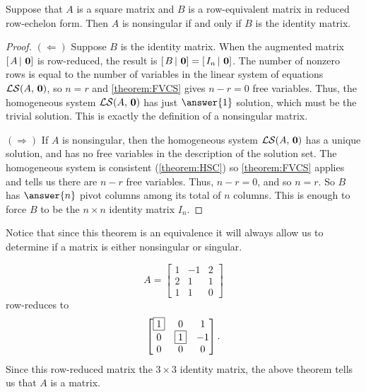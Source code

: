 \documentclass{ximera}
\begin{document}
\begin{theorem}
  \label{theorem:NMRRI}
  Suppose that $A$ is a square matrix and $B$ is a row-equivalent
  matrix in reduced row-echelon form.  Then $A$ is nonsingular if and
  only if $B$ is the identity matrix.

\begin{proof}
  $(\Leftarrow)$ Suppose $B$ is the identity matrix.  When the
  augmented matrix $\left\lbrack\left.A\,\right\rvert\,\mathbf{0}\right\rbrack$ is row-reduced, the
  result is $\left\lbrack\left.B\,\right\rvert\,\mathbf{0}\right\rbrack=\left\lbrack\left.I_n\,\right\rvert\,\mathbf{0}\right\rbrack$.
  The number of nonzero rows is equal to the number of variables in
  the linear system of equations $\mathcal{LS}\!\left(A,\,\mathbf{0}\right)$, so
  $n=r$ and \ref{theorem:FVCS} gives $n-r=0$ free variables.  Thus,
  the homogeneous system $\mathcal{LS}\!\left(A,\,\mathbf{0}\right)$ has just $\answer{1}$
  solution, which must be the trivial solution.  This is exactly the
  definition of a nonsingular matrix.

  $(\Rightarrow)$ If $A$ is nonsingular, then the homogeneous system
  $\mathcal{LS}\!\left(A,\,\mathbf{0}\right)$ has a unique solution, and has no
  free variables in the description of the solution set.  The
  homogeneous system is consistent (\ref{theorem:HSC}) so
  \ref{theorem:FVCS} applies and tells us there are $n-r$ free
  variables.  Thus, $n-r=0$, and so $n=r$.  So $B$ has $\answer{n}$
  pivot columns among its total of $n$ columns.  This is enough to
  force $B$ to be the $n\times n$ identity matrix $I_n$.
\end{proof}
\end{theorem}

Notice that since this theorem is an equivalence it will always allow
us to determine if a matrix is either nonsingular or singular.

\begin{example}
  \[
    A = \begin{bmatrix}
      1 & -1 & 2 \\
      2 & 1 & 1 \\
      1 & 1 & 0  
    \end{bmatrix}
  \]
  row-reduces to
  \[
    \begin{bmatrix}
      \fbox{1} & 0 & 1 \\
      0 & \fbox{1} & -1 \\
      0 & 0 & 0 
    \end{bmatrix}.
  \]
  Since this row-reduced matrix
   the $3\times 3$
  identity matrix, the above theorem tells us that $A$ is a
   matrix.
\end{example}
\end{document}
